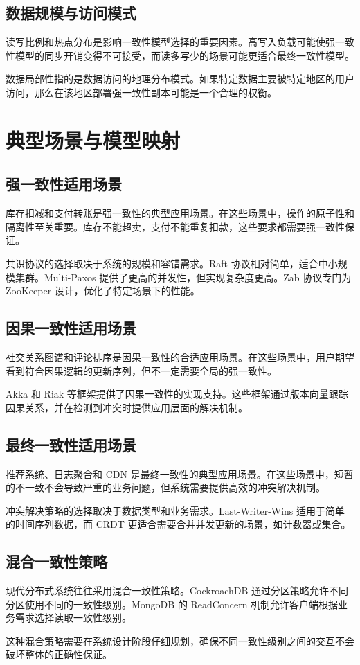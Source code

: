 \section{数据规模与访问模式}
读写比例和热点分布是影响一致性模型选择的重要因素。高写入负载可能使强一致性模型的同步开销变得不可接受，而读多写少的场景可能更适合最终一致性模型。\par
数据局部性指的是数据访问的地理分布模式。如果特定数据主要被特定地区的用户访问，那么在该地区部署强一致性副本可能是一个合理的权衡。\par
\chapter{典型场景与模型映射}
\section{强一致性适用场景}
库存扣减和支付转账是强一致性的典型应用场景。在这些场景中，操作的原子性和隔离性至关重要。库存不能超卖，支付不能重复扣款，这些要求都需要强一致性保证。\par
共识协议的选择取决于系统的规模和容错需求。Raft 协议相对简单，适合中小规模集群。Multi-Paxos 提供了更高的并发性，但实现复杂度更高。Zab 协议专门为 ZooKeeper 设计，优化了特定场景下的性能。\par
\section{因果一致性适用场景}
社交关系图谱和评论排序是因果一致性的合适应用场景。在这些场景中，用户期望看到符合因果逻辑的更新序列，但不一定需要全局的强一致性。\par
Akka 和 Riak 等框架提供了因果一致性的实现支持。这些框架通过版本向量跟踪因果关系，并在检测到冲突时提供应用层面的解决机制。\par
\section{最终一致性适用场景}
推荐系统、日志聚合和 CDN 是最终一致性的典型应用场景。在这些场景中，短暂的不一致不会导致严重的业务问题，但系统需要提供高效的冲突解决机制。\par
冲突解决策略的选择取决于数据类型和业务需求。Last-Writer-Wins 适用于简单的时间序列数据，而 CRDT 更适合需要合并并发更新的场景，如计数器或集合。\par
\section{混合一致性策略}
现代分布式系统往往采用混合一致性策略。CockroachDB 通过分区策略允许不同分区使用不同的一致性级别。MongoDB 的 ReadConcern 机制允许客户端根据业务需求选择读取一致性级别。\par
这种混合策略需要在系统设计阶段仔细规划，确保不同一致性级别之间的交互不会破坏整体的正确性保证。\par
